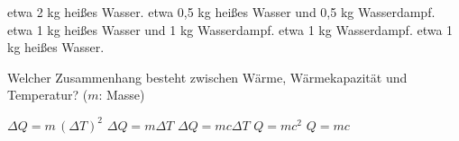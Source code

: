 \documentclass[11pt]{exam}
\begin{document}
\begin{questions}
\begin{choices}
	\choice etwa 2 kg heißes Wasser.
	\choice etwa 0,5 kg heißes Wasser und 0,5 kg Wasserdampf.
	\choice etwa 1 kg heißes Wasser und 1 kg Wasserdampf.
	\choice etwa 1 kg Wasserdampf.
	\choice etwa 1 kg heißes Wasser.
\end{choices}

\vspace{3mm}\question Welcher Zusammenhang besteht zwischen Wärme, Wärmekapazität und Temperatur? (\(m\): Masse)

\begin{choices}
	\choice \(\Delta Q = m \, (\Delta T)^2\)
	\choice \(\Delta Q = m \Delta T\)
	\choice \(\Delta Q = m c \Delta T\)
	\choice \(Q = m c^2\)
	\choice \(Q = m c\)
\end{choices}

\vspace{3mm}\end{questions}
\end{document}
